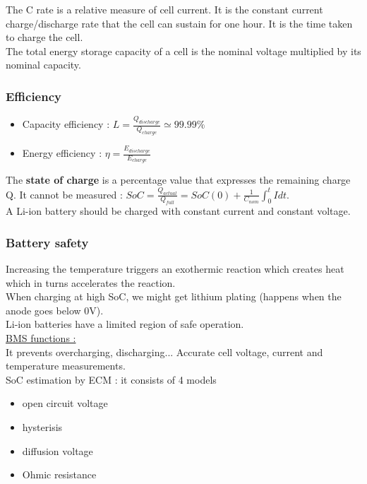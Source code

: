 \documentclass[../main.tex]{subfiles}
\begin{document}
The C rate is a relative measure of cell current. It is the constant current charge/discharge rate that the cell can sustain for one hour. It is the time taken to charge the cell.\\
The total energy storage capacity of a cell is the nominal voltage multiplied by its nominal capacity.\\

\subsubsection{Efficiency}
\begin{itemize}
    \item Capacity efficiency : $L = \frac{Q_{discharge}}{Q_{charge}} \simeq 99.99\%$
    \item Energy efficiency : $\eta = \frac{E_{discharge}}{E_{charge}}$
\end{itemize}

The \textbf{state of charge} is a percentage value that expresses the remaining charge Q. It cannot be measured : $SoC = \frac{Q_{actual}}{Q_{full}} = SoC (0) + \frac{1}{C_{nom}} \int_0^t Idt$.\\

A Li-ion battery should be charged with constant current and constant voltage.\\

\subsubsection{Battery safety}

Increasing the temperature triggers an exothermic reaction which creates heat which in turns accelerates the reaction.\\
When charging at high SoC, we might get lithium plating (happens when the anode goes below 0V).\\
Li-ion batteries have a limited region of safe operation. \\

\quad \underline{BMS functions :}\\
It prevents overcharging, discharging... Accurate cell voltage, current and temperature measurements. \\
SoC estimation by ECM : it consists of 4 models \begin{itemize}
    \item open circuit voltage
    \item hysterisis
    \item diffusion voltage
    \item Ohmic resistance
\end{itemize}
\end{document}

